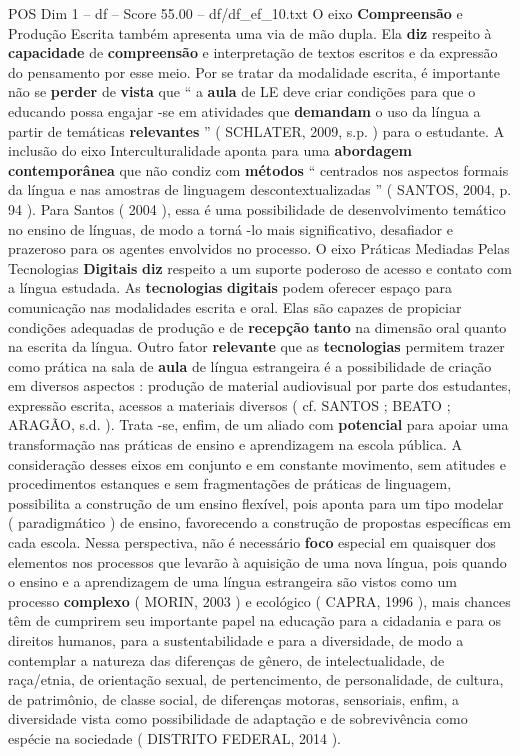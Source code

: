 \begin{textsample}{POS Dim 1 – df – Score 55.00 – df/df\_ef\_10.txt}
O eixo \textbf{Compreensão} e Produção Escrita também apresenta uma via de mão dupla.
Ela \textbf{diz} respeito à \textbf{capacidade} de \textbf{compreensão} e interpretação de textos escritos e da expressão do pensamento por esse meio.
Por se tratar da modalidade escrita, é importante não se \textbf{perder} de \textbf{vista} que “ a \textbf{aula} de LE deve criar condições para que o educando possa engajar -se em atividades que \textbf{demandam} o uso da língua a partir de temáticas \textbf{relevantes} ” ( SCHLATER, 2009, s.p. ) para o estudante.
A inclusão do eixo Interculturalidade aponta para uma \textbf{abordagem} \textbf{contemporânea} que não condiz com \textbf{métodos} “ centrados nos aspectos formais da língua e nas amostras de linguagem descontextualizadas ” ( SANTOS, 2004, p. 94 ).
Para Santos ( 2004 ), essa é uma possibilidade de desenvolvimento temático no ensino de línguas, de modo a torná -lo mais significativo, desafiador e prazeroso para os agentes envolvidos no processo.
O eixo Práticas Mediadas Pelas Tecnologias \textbf{Digitais} \textbf{diz} respeito a um suporte poderoso de acesso e contato com a língua estudada.
As \textbf{tecnologias} \textbf{digitais} podem oferecer espaço para comunicação nas modalidades escrita e oral.
Elas são capazes de propiciar condições adequadas de produção e de \textbf{recepção} \textbf{tanto} na dimensão oral quanto na escrita da língua.
Outro fator \textbf{relevante} que as \textbf{tecnologias} permitem trazer como prática na sala de \textbf{aula} de língua estrangeira é a possibilidade de criação em diversos aspectos : produção de material audiovisual por parte dos estudantes, expressão escrita, acessos a materiais diversos ( cf.
SANTOS ; BEATO ; ARAGÃO, s.d. ).
Trata -se, enfim, de um aliado com \textbf{potencial} para apoiar uma transformação nas práticas de ensino e aprendizagem na escola pública.
A consideração desses eixos em conjunto e em constante movimento, sem atitudes e procedimentos estanques e sem fragmentações de práticas de linguagem, possibilita a construção de um ensino flexível, pois aponta para um tipo modelar ( paradigmático ) de ensino, favorecendo a construção de propostas específicas em cada escola.
Nessa perspectiva, não é necessário \textbf{foco} especial em quaisquer dos elementos nos processos que levarão à aquisição de uma nova língua, pois quando o ensino e a aprendizagem de uma língua estrangeira são vistos como um processo \textbf{complexo} ( MORIN, 2003 ) e ecológico ( CAPRA, 1996 ), mais chances têm de cumprirem seu importante papel na educação para a cidadania e para os direitos humanos, para a sustentabilidade e para a diversidade, de modo a contemplar a natureza das diferenças de gênero, de intelectualidade, de raça/etnia, de orientação sexual, de pertencimento, de personalidade, de cultura, de patrimônio, de classe social, de diferenças motoras, sensoriais, enfim, a diversidade vista como possibilidade de adaptação e de sobrevivência como espécie na sociedade ( DISTRITO FEDERAL, 2014 ).

\end{textsample}
